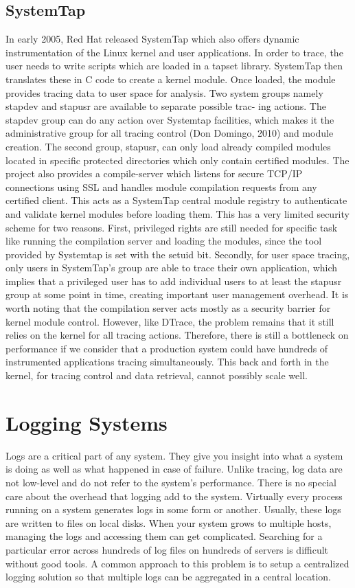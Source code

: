 \subsection{SystemTap}
In early 2005, Red Hat released SystemTap \cite{systemtap} which also
offers dynamic instrumentation of the Linux kernel and user applications. In
order to trace, the user needs to write scripts which are loaded in a tapset
library. SystemTap then translates these in C code to create a kernel module.
Once loaded, the module provides tracing data to user space for analysis.
Two system groups namely stapdev and stapusr are available to separate possible
trac- ing actions. The stapdev group can do any action over Systemtap
facilities, which makes it the administrative group for all tracing control (Don
Domingo, 2010) and module creation.
The second group, stapusr, can only load already compiled modules located in
specific protected directories which only contain certified modules.
The project also provides a compile-server which listens for secure TCP/IP
connections using SSL and handles module compilation requests from any certified
client. This acts as a SystemTap central module registry to authenticate and
validate kernel modules before loading them.
This has a very limited security scheme for two reasons. First, privileged
rights are still needed for specific task like running the compilation server
and loading the modules, since the tool provided by Systemtap is set with the
setuid bit. Secondly, for user space tracing, only users in SystemTap’s group
are able to trace their own application, which implies that a privileged user
has to add individual users to at least the stapusr group at some point in time,
creating important user management overhead.
It is worth noting that the compilation server acts mostly as a security barrier
for kernel module control. However, like DTrace, the problem remains that it
still relies on the kernel for all tracing actions. Therefore, there is still a
bottleneck on performance if we consider that a production system could have
hundreds of instrumented applications tracing simultaneously. This back and
forth in the kernel, for tracing control and data retrieval, cannot possibly
scale well.

\section{Logging Systems}\label{sec:logging-bkg}

Logs are a critical part of any system. They give you insight into what a system
is doing as well as what happened in case of failure. Unlike tracing, log data
are not low-level and do not refer to the system's performance. There is no
special care about the overhead that logging add to the system. Virtually every
process running on a system generates logs in some form or another. Usually,
these logs are written to files on local disks. When your system grows to
multiple hosts, managing the logs and accessing them can get complicated.
Searching for a particular error across hundreds of log files on hundreds of
servers is difficult without good tools. A common approach to this problem is to
setup a centralized logging solution so that multiple logs can be aggregated in
a central location.

